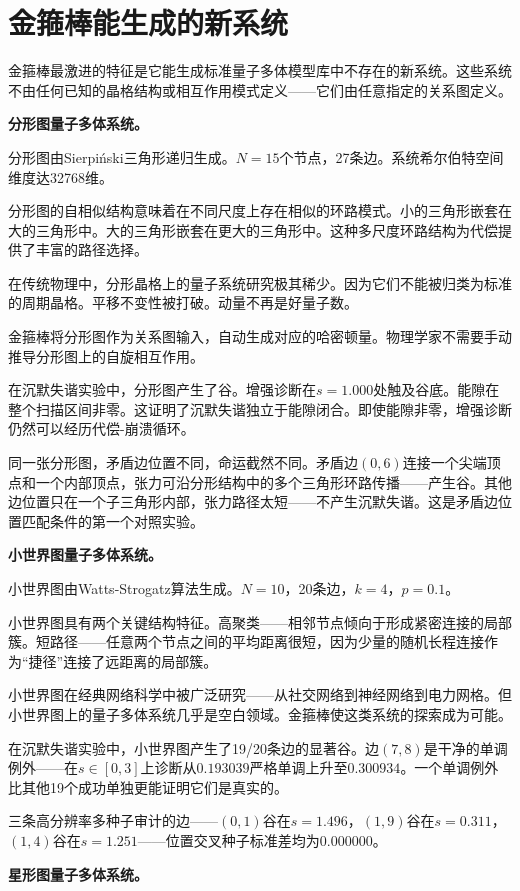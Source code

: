 \documentclass[11pt,a4paper]{book}
\theoremstyle{definition}
\begin{document}
\section{金箍棒能生成的新系统}

金箍棒最激进的特征是它能生成标准量子多体模型库中不存在的新系统。这些系统不由任何已知的晶格结构或相互作用模式定义——它们由任意指定的关系图定义。

\textbf{分形图量子多体系统。}

分形图由Sierpiński三角形递归生成。$N=15$个节点，27条边。系统希尔伯特空间维度达32768维。

分形图的自相似结构意味着在不同尺度上存在相似的环路模式。小的三角形嵌套在大的三角形中。大的三角形嵌套在更大的三角形中。这种多尺度环路结构为代偿提供了丰富的路径选择。

在传统物理中，分形晶格上的量子系统研究极其稀少。因为它们不能被归类为标准的周期晶格。平移不变性被打破。动量不再是好量子数。

金箍棒将分形图作为关系图输入，自动生成对应的哈密顿量。物理学家不需要手动推导分形图上的自旋相互作用。

在沉默失谐实验中，分形图产生了谷。增强诊断在$s=1.000$处触及谷底。能隙在整个扫描区间非零。这证明了沉默失谐独立于能隙闭合。即使能隙非零，增强诊断仍然可以经历代偿-崩溃循环。

同一张分形图，矛盾边位置不同，命运截然不同。矛盾边$(0,6)$连接一个尖端顶点和一个内部顶点，张力可沿分形结构中的多个三角形环路传播——产生谷。其他边位置只在一个子三角形内部，张力路径太短——不产生沉默失谐。这是矛盾边位置匹配条件的第一个对照实验。

\textbf{小世界图量子多体系统。}

小世界图由Watts-Strogatz算法生成。$N=10$，20条边，$k=4$，$p=0.1$。

小世界图具有两个关键结构特征。高聚类——相邻节点倾向于形成紧密连接的局部簇。短路径——任意两个节点之间的平均距离很短，因为少量的随机长程连接作为“捷径”连接了远距离的局部簇。

小世界图在经典网络科学中被广泛研究——从社交网络到神经网络到电力网格。但小世界图上的量子多体系统几乎是空白领域。金箍棒使这类系统的探索成为可能。

在沉默失谐实验中，小世界图产生了19/20条边的显著谷。边$(7,8)$是干净的单调例外——在$s\in[0,3]$上诊断从$0.193039$严格单调上升至$0.300934$。一个单调例外比其他19个成功单独更能证明它们是真实的。

三条高分辨率多种子审计的边——$(0,1)$谷在$s=1.496$，$(1,9)$谷在$s=0.311$，$(1,4)$谷在$s=1.251$——位置交叉种子标准差均为$0.000000$。

\textbf{星形图量子多体系统。}
\end{document}
